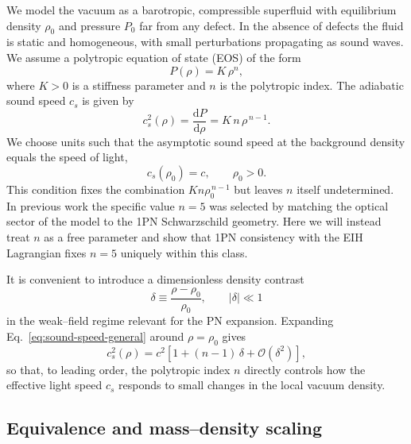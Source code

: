 \documentclass[11pt]{article}
\newcommand{\cS}{c_s}
\newcommand{\dd}{\mathrm{d}}
\newcommand{\rhozero}{\rho_0}
\begin{document}
We model the vacuum as a barotropic, compressible superfluid with equilibrium
density $\rhozero$ and pressure $P_0$ far from any defect.  In the absence of
defects the fluid is static and homogeneous, with small perturbations
propagating as sound waves.  We assume a polytropic equation of state (EOS)
of the form
\begin{equation}
  P(\rho) = K\,\rho^n,
  \label{eq:polytropic-eos}
\end{equation}
where $K>0$ is a stiffness parameter and $n$ is the polytropic index.  The
adiabatic sound speed $\cS$ is given by
\begin{equation}
  \cS^2(\rho) = \frac{\dd P}{\dd \rho}
  = K\,n\,\rho^{\,n-1}.
  \label{eq:sound-speed-general}
\end{equation}
We choose units such that the asymptotic sound speed at the background
density equals the speed of light,
\begin{equation}
  \cS(\rhozero) = c,
  \qquad
  \rhozero > 0.
  \label{eq:cs-background}
\end{equation}
This condition fixes the combination $K n \rhozero^{\,n-1}$ but leaves $n$
itself undetermined.  In previous work the specific value $n=5$ was selected
by matching the optical sector of the model to the 1PN Schwarzschild
geometry.  Here we will instead treat $n$ as a free parameter and show that
1PN consistency with the EIH Lagrangian fixes $n=5$ uniquely within this
class.

It is convenient to introduce a dimensionless density contrast
\begin{equation}
  \delta \equiv \frac{\rho - \rhozero}{\rhozero},
  \qquad
  |\delta| \ll 1
  \label{eq:density-contrast}
\end{equation}
in the weak--field regime relevant for the PN expansion.  Expanding
Eq.~\eqref{eq:sound-speed-general} around $\rho=\rhozero$ gives
\begin{equation}
  \cS^2(\rho)
  = c^2 \left[ 1 + (n-1)\,\delta + \mathcal{O}(\delta^2) \right],
  \label{eq:cs-expansion}
\end{equation}
so that, to leading order, the polytropic index $n$ directly controls how
the effective light speed $c_s$ responds to small changes in the local
vacuum density.

\subsection{Equivalence and mass--density scaling}
\label{subsec:thermo-equivalence}
\end{document}
